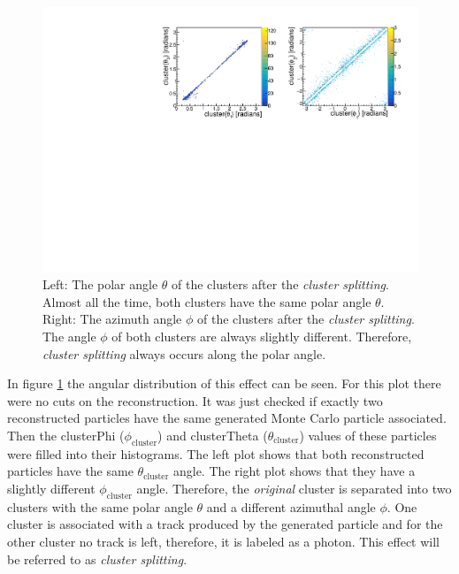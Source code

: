 \documentclass[a4paper,11pt,twosided,final,german,openbib,pdftex,listof=totoc,bibliography=totoc]{scrbook}
\begin{document}
\begin{figure}[h!]
	\centering
	\includegraphics[width=\textwidth]{AnhangPlots/ttpp.pdf}
	\caption[Cluster Splitting Angle Distribution]{Left: The polar angle $\theta$ of the clusters after the \textit{cluster splitting}. Almost all the time, both clusters have the same polar angle $\theta$.  Right: The azimuth angle $\phi$ of the clusters after the \textit{cluster splitting}. The angle $\phi$ of both clusters are always slightly different. Therefore, \textit{cluster splitting} always occurs along the polar angle.}
	\label{fig:clusterSplittingAngle}
\end{figure}








In figure \ref{fig:clusterSplittingAngle} the angular distribution of this effect can be seen. For this plot there were no cuts on the reconstruction. It was just checked if exactly two reconstructed particles have the same generated Monte Carlo particle associated. Then the clusterPhi ($\phi_{\textrm{cluster}}$) and clusterTheta ($\theta_{\textrm{cluster}}$) values of these particles were filled into their histograms. The left plot shows that both reconstructed particles have the same $\theta_{\textrm{cluster}}$ angle. The right plot shows that they have a slightly different $\phi_{\textrm{cluster}}$ angle. Therefore, the \textit{original} cluster  is separated into two clusters with the same polar angle $\theta$ and a different azimuthal angle $\phi$. One cluster is associated with a track produced by the generated particle and for the other cluster no track is left, therefore, it is labeled as a photon. This effect will be referred to as \textit{cluster splitting}.
\end{document}

